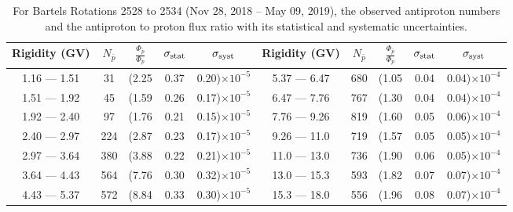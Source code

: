 \begin{table}[p] 
\renewcommand\baselinestretch{1.3}\selectfont
\setlength\tabcolsep{3pt}
\centering
\begin{tabular}{ccccc | ccccc}
\hline
\textbf{Rigidity}  (GV)  & $N_{\bar{p}}$ & $\frac{\Phi_{\bar{p}}}{\Phi_{p}}$ & $\sigma_{\rm{stat}}$ & $\sigma_{\rm{syst}}$ \hspace{1cm}   & \textbf{Rigidity}  (GV)  & $N_{\bar{p}}$ & $\frac{\Phi_{\bar{p}}}{\Phi_{p}}$ & $\sigma_{\rm{stat}}$ & $\sigma_{\rm{syst}}$ \hspace{1cm} \\ 
\hline
1.16 — 1.51   &  31                  &(2.25                          &  0.37              &      0.20)$\times 10^{-5}$  & 5.37 — 6.47                &  680                    &(1.05                                &  0.04                   &      0.04)$\times 10^{-4}$\\
1.51 — 1.92   &  45                  &(1.59                          &  0.26              &      0.17)$\times 10^{-5}$  & 6.47 — 7.76                &  767                    &(1.30                                &  0.04                   &      0.04)$\times 10^{-4}$\\
1.92 — 2.40   &  97                  &(1.76                          &  0.21              &      0.15)$\times 10^{-5}$  & 7.76 — 9.26                &  819                    &(1.60                                &  0.05                   &      0.06)$\times 10^{-4}$\\    
2.40 — 2.97   &  224                &(2.87                          &  0.23              &      0.17)$\times 10^{-5}$  & 9.26 — 11.0                &  719                    &(1.57                                &  0.05                   &      0.05)$\times 10^{-4}$\\    
2.97 — 3.64   &  380                &(3.88                          &  0.22              &      0.21)$\times 10^{-5}$  & 11.0 — 13.0                 &  736                    &(1.90                                &  0.06                   &      0.05)$\times 10^{-4}$\\
3.64 — 4.43   &  564                &(7.76                          &  0.30              &      0.32)$\times 10^{-5}$  & 13.0 — 15.3               &  593                    &(1.82                                &  0.07                   &      0.07)$\times 10^{-4}$\\
4.43 — 5.37   &  572                &(8.84                          &  0.33              &      0.30)$\times 10^{-5}$  & 15.3 — 18.0               &  556                    &(1.96                                &  0.08                   &      0.07)$\times 10^{-4}$\\
\hline
\end{tabular}
\caption[Antiproton to proton flux ratio for Bartels Rotations 2528 to 2534]{For Bartels Rotations 2528 to 2534 (Nov 28, 2018 – May 09, 2019), the observed antiproton numbers and the antiproton to proton flux ratio with its statistical and systematic uncertainties.}
\label{TableOfDependent18}
\end{table}


